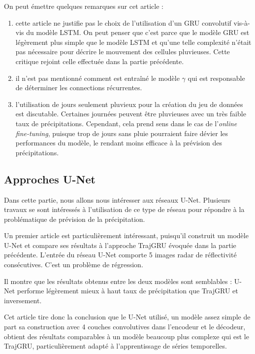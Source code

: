 \documentclass[12pt,a4paper,french]{article}
\newcommand\subsecspacing{1cm}
\begin{document}
On peut émettre quelques remarques sur cet article :
\begin{enumerate}
    \item cette article ne justifie pas le choix de l'utilisation d'un GRU convolutif vis-à-vis du modèle LSTM. On peut penser que c'est parce que le modèle GRU est légèrement plus simple que le modèle LSTM et qu'une telle complexité n'était pas nécessaire pour décrire le mouvement des cellules pluvieuses. Cette critique rejoint celle effectuée dans la partie précédente.
    \item il n'est pas mentionné comment est entraîné le modèle $ \gamma $ qui est responsable de déterminer les connections récurrentes.
    \item l'utilisation de jours seulement pluvieux pour la création du jeu de données est discutable. Certaines journées peuvent être pluvieuses avec un très faible taux de précipitations. Cependant, cela prend sens dans le cas de l'\textit{online fine-tuning}, puisque trop de jours sans pluie pourraient faire dévier les performances du modèle, le rendant moins efficace à la prévision des précipitations. 
\end{enumerate}

\vspace{\subsecspacing}

\subsection{Approches U-Net}

Dans cette partie, nous allons nous intéresser aux réseaux U-Net. Plusieurs travaux se sont intéressés à l'utilisation de ce type de réseau pour répondre à la problématique de prévision de la précipitation. \newline

Un premier article est particulièrement intéressant, puisqu'il construit un modèle U-Net et compare ses résultats à l'approche TrajGRU évoquée dans la partie précédente. L'entrée du réseau U-Net comporte 5 images radar de réflectivité consécutives. C'est un problème de régression.

Il montre que les résultats obtenus entre les deux modèles sont semblables : U-Net performe légèrement mieux à haut taux de précipitation que TrajGRU et inversement.  

Cet article tire donc la conclusion que le U-Net utilisé, un modèle assez simple de part sa construction avec 4 couches convolutives dans l'encodeur et le décodeur, obtient des résultats comparables à un modèle beaucoup plus complexe qui est le TrajGRU, particulièrement adapté à l'apprentissage de séries temporelles. \cite{9508500}
\end{document}
